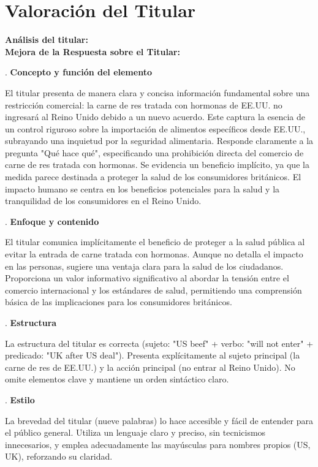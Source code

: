 \documentclass[10pt,a4paper]{article}
\begin{document}
\section*{Valoración del Titular}
        \textbf{Análisis del titular:} \\ 
        \textbf{Mejora de la Respuesta sobre el Titular:}
\par{}. \textbf{Concepto y funci\'{o}n del elemento}
\par\medskip
   El titular presenta de manera clara y concisa informaci\'{o}n fundamental sobre una restricci\'{o}n comercial: la carne de res tratada con hormonas de EE.UU. no ingresar\'{a} al Reino Unido debido a un nuevo acuerdo. Este captura la esencia de un control riguroso sobre la importaci\'{o}n de alimentos espec\'{i}ficos desde EE.UU., subrayando una inquietud por la seguridad alimentaria. Responde claramente a la pregunta "Qu\'{e} hace qu\'{e}", especificando una prohibici\'{o}n directa del comercio de carne de res tratada con hormonas. Se evidencia un beneficio impl\'{i}cito, ya que la medida parece destinada a proteger la salud de los consumidores brit\'{a}nicos. El impacto humano se centra en los beneficios potenciales para la salud y la tranquilidad de los consumidores en el Reino Unido.
\par{}. \textbf{Enfoque y contenido}
\par\medskip
   El titular comunica impl\'{i}citamente el beneficio de proteger a la salud p\'{u}blica al evitar la entrada de carne tratada con hormonas. Aunque no detalla el impacto en las personas, sugiere una ventaja clara para la salud de los ciudadanos. Proporciona un valor informativo significativo al abordar la tensi\'{o}n entre el comercio internacional y los est\'{a}ndares de salud, permitiendo una comprensi\'{o}n b\'{a}sica de las implicaciones para los consumidores brit\'{a}nicos.
\par{}. \textbf{Estructura}
\par\medskip
   La estructura del titular es correcta (sujeto: "US beef" + verbo: "will not enter" + predicado: "UK after US deal"). Presenta expl\'{i}citamente al sujeto principal (la carne de res de EE.UU.) y la acci\'{o}n principal (no entrar al Reino Unido). No omite elementos clave y mantiene un orden sint\'{a}ctico claro.
\par{}. \textbf{Estilo}
\par\medskip
   La brevedad del titular (nueve palabras) lo hace accesible y f\'{a}cil de entender para el p\'{u}blico general. Utiliza un lenguaje claro y preciso, sin tecnicismos innecesarios, y emplea adecuadamente las may\'{u}sculas para nombres propios (US, UK), reforzando su claridad.
\end{document}
